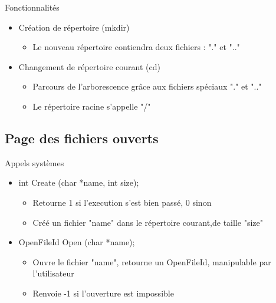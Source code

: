 \documentclass{beamer}
\begin{document}
\begin{frame}
  \begin{block}{Fonctionnalités}
  	\begin{itemize}[<+->]
  		\item Création de répertoire (mkdir)
  		\begin{itemize}
  			\item Le nouveau répertoire contiendra deux fichiers : "." et ".."
  		\end{itemize}
  		\item Changement de répertoire courant (cd)
  		\begin{itemize}
  			\item Parcours de l'arborescence grâce aux fichiers spéciaux "." et ".."
  			\item Le répertoire racine s'appelle "/"
  		\end{itemize}
  	\end{itemize}
  \end{block}
\end{frame}

\subsection{Page des fichiers ouverts}
\begin{frame}
	\begin{block}{Appels systèmes}
		\begin{itemize}
			\item<1-> int Create (char *name, int size);
			\begin{itemize}
				\item<1->Retourne 1 si l'execution s'est bien passé, 0 sinon
				\item<1->Créé un fichier "name" dans le répertoire courant,de taille "size"
			\end{itemize}
			\item<2-> OpenFileId Open (char *name);
			\begin{itemize}
				\item<1->Ouvre le fichier "name", retourne un OpenFileId, manipulable par l'utilisateur
				\item<1->Renvoie -1 si l'ouverture est impossible
			\end{itemize}			
		\end{itemize}
	\end{block}
\end{frame}
\end{document}
